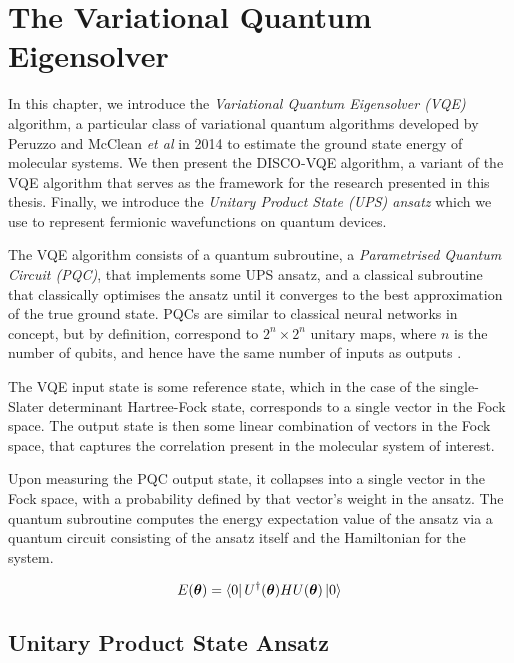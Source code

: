 \section{The Variational Quantum Eigensolver}%
\label{vqe}

In this chapter, we introduce the \textit{Variational Quantum Eigensolver (VQE)} algorithm, a particular class of variational quantum algorithms developed by Peruzzo and McClean \textit{et al} \cite{Peruzzo2014} in 2014 to estimate the ground state energy of molecular systems. We then present the DISCO-VQE algorithm, a variant of the VQE algorithm that serves as the framework for the research presented in this thesis. Finally, we introduce the \textit{Unitary Product State (UPS) ansatz} which we use to represent fermionic wavefunctions on quantum devices.

The VQE algorithm consists of a quantum subroutine, a \textit{Parametrised Quantum Circuit (PQC)}, that implements some UPS ansatz, and a classical subroutine that classically optimises the ansatz until it converges to the best approximation of the true ground state. PQCs are similar to classical neural networks in concept, but by definition, correspond to $2^n \times 2^n$ unitary maps, where $n$ is the number of qubits, and hence have the same number of inputs as outputs \cite{Yeung2020}.

The VQE input state is some reference state, which in the case of the single-Slater determinant Hartree-Fock state, corresponds to a single vector in the Fock space. The output state is then some linear combination of vectors in the Fock space, that captures the correlation present in the molecular system of interest.

Upon measuring the PQC output state, it collapses into a single vector in the Fock space, with a probability defined by that vector's weight in the ansatz. The quantum subroutine computes the energy expectation value of the ansatz via a quantum circuit consisting of the ansatz itself and the Hamiltonian for the system.

\begin{equation*}
    E(\bm\theta) = \bra{0} U^\dagger(\bm\theta) H U(\bm\theta) \ket{0} 
\end{equation*}


\subsection{Unitary Product State Ansatz}%
\label{ups-ansatz}

